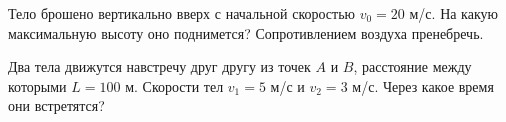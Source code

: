 Тело брошено вертикально вверх с начальной скоростью $v_0 = 20$ м/с. 
На какую максимальную высоту оно поднимется? Сопротивлением воздуха пренебречь.

Два тела движутся навстречу друг другу из точек $A$ и $B$, расстояние между которыми $L = 100$ м. 
Скорости тел $v_1 = 5$ м/с и $v_2 = 3$ м/с. Через какое время они встретятся?
